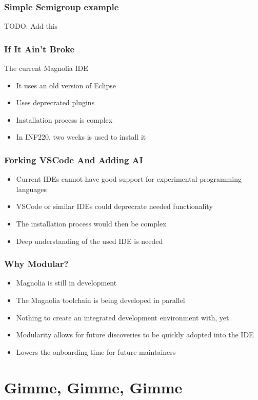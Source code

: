\documentclass{beamer}
\begin{document}
\begin{frame}
    \frametitle{Simple Semigroup example}
    TODO: Add this
\end{frame}

\begin{frame}
    \frametitle{If It Ain't Broke}
    The current Magnolia IDE
    \begin{itemize}
        \item It uses an old version of Eclipse
        \item Uses deprecrated plugins
        \item Installation process is complex
        \item In INF220, two weeks is used to install it
    \end{itemize}
\end{frame}

\begin{frame}
  \frametitle{Forking VSCode And Adding AI}
  \begin{itemize}
    \item Current IDEs cannot have good support for experimental programming
      languages
    \item VSCode or similar IDEs could deprecrate needed functionality
    \item The installation process would then be complex
    \item Deep understanding of the used IDE is needed
  \end{itemize}
\end{frame}

\begin{frame}
  \frametitle{Why Modular?}
  \begin{itemize}
    \item Magnolia is still in development
    \item The Magnolia toolchain is being developed in parallel
    \item Nothing to create an integrated development environment with, yet.
    \item Modularity allows for future discoveries to be quickly adopted into
      the IDE
    \item Lowers the onboarding time for future maintainers
  \end{itemize}
\end{frame}

\section{Gimme, Gimme, Gimme}
\SectionPage
\end{document}
